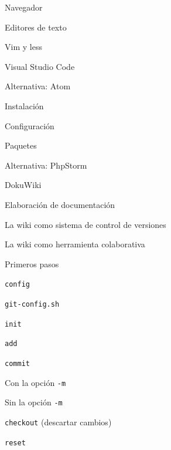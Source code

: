 \begin{longenum}
\begin{longenum}
\begin{longenum}
\begin{longenum}
            \end{longenum}
            \item Navegador
            \item Editores de texto
            \begin{longenum}
                \item Vim y less
                \item Visual Studio Code
                \item Alternativa: Atom
                \begin{longenum}
                    \item Instalación
                    \item Configuración
                    \item Paquetes
                \end{longenum}
                \item Alternativa: PhpStorm
            \end{longenum}
            \item DokuWiki \opcional\
            \begin{longenum}
                \item Elaboración de documentación
                \item La wiki como sistema de control de versiones
                \item La wiki como herramienta colaborativa
            \end{longenum}
        \end{longenum}
        \item Primeros pasos
        \begin{longenum}
            \item \texttt{config}
            \item \texttt{git-config.sh}
            \item \texttt{init}
            \item \texttt{add}
            \item \texttt{commit}
            \begin{longenum}
                \item Con la opción \texttt{-m}
                \item Sin la opción \texttt{-m}
            \end{longenum}
            \item \texttt{checkout} (descartar cambios)
            \item \texttt{reset}

\end{longenum}
\end{longenum}
\end{longenum}
